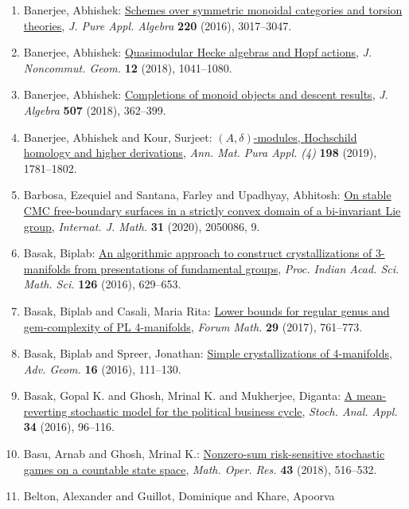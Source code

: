\begin{enumerate}
\item Banerjee, Abhishek: \href{http://dx.doi.org/10.1016/j.jpaa.2016.02.001}{Schemes over symmetric monoidal categories and torsion
theories}, \emph{J. Pure Appl. Algebra} {\bf 220} (2016), 3017--3047.
\item Banerjee, Abhishek: \href{https://doi.org/10.4171/JNCG/297}{Quasimodular {H}ecke algebras and {H}opf actions}, \emph{J. Noncommut. Geom.} {\bf 12} (2018), 1041--1080.
\item Banerjee, Abhishek: \href{https://doi.org/10.1016/j.jalgebra.2018.04.022}{Completions of monoid objects and descent results}, \emph{J. Algebra} {\bf 507} (2018), 362--399.
\item Banerjee, Abhishek and Kour, Surjeet: \href{https://doi.org/10.1007/s10231-019-00844-x}{{$(A,\delta)$}-modules, {H}ochschild homology and higher
derivations}, \emph{Ann. Mat. Pura Appl. (4)} {\bf 198} (2019), 1781--1802.
\item Barbosa, Ezequiel and Santana, Farley and Upadhyay, Abhitosh: \href{https://doi.org/10.1142/S0129167X2050086X}{On stable {CMC} free-boundary surfaces in a strictly convex
domain of a bi-invariant {L}ie group}, \emph{Internat. J. Math.} {\bf 31} (2020), 2050086, 9.
\item Basak, Biplab: \href{https://doi.org/10.1007/s12044-016-0302-7}{An algorithmic approach to construct crystallizations of
3-manifolds from presentations of fundamental groups}, \emph{Proc. Indian Acad. Sci. Math. Sci.} {\bf 126} (2016), 629--653.
\item Basak, Biplab and Casali, Maria Rita: \href{https://doi.org/10.1515/forum-2015-0080}{Lower bounds for regular genus and gem-complexity of {PL}
4-manifolds}, \emph{Forum Math.} {\bf 29} (2017), 761--773.
\item Basak, Biplab and Spreer, Jonathan: \href{https://doi.org/10.1515/advgeom-2015-0043}{Simple crystallizations of 4-manifolds}, \emph{Adv. Geom.} {\bf 16} (2016), 111--130.
\item Basak, Gopal K. and Ghosh, Mrinal K. and Mukherjee, Diganta: \href{https://doi.org/10.1080/07362994.2015.1106321}{A mean-reverting stochastic model for the political business
cycle}, \emph{Stoch. Anal. Appl.} {\bf 34} (2016), 96--116.
\item Basu, Arnab and Ghosh, Mrinal K.: \href{https://doi.org/10.1287/moor.2017.0870}{Nonzero-sum risk-sensitive stochastic games on a countable
state space}, \emph{Math. Oper. Res.} {\bf 43} (2018), 516--532.
\item Belton, Alexander and Guillot, Dominique and Khare, Apoorva

\end{enumerate}
